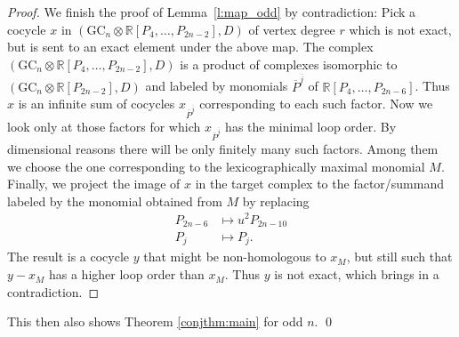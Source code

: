 \documentclass[a4paper]{amsart}
\theoremstyle{plain}
\theoremstyle{definition}
\newcommand{\R}{{\mathbb{R}}}
\newcommand{\GC}{\mathrm{GC}}
\begin{document}
\begin{proof}
We finish the proof of Lemma~\ref{l:map_odd} by contradiction: Pick a cocycle $x$ in $(\GC_n \otimes \R[P_4,\dots,P_{2n-2}], D)$ of vertex degree $r$ which is not exact, but is sent to an exact element under the above map. The complex $(\GC_n \otimes \R[P_4,\dots,P_{2n-2}], D)$ is a product of complexes
isomorphic to $(\GC_n\otimes \R[P_{2n-2}],D)$ and labeled by monomials ${\overline P}^{\overline j}$ of $\R[P_4,\dots,P_{2n-6}]$. 
Thus $x$ is an infinite sum  of cocycles $x_{{\overline P}^{\overline j}}$ corresponding to each such factor. Now we look only at those factors for which $x_{{\overline P}^{\overline j}}$  has the minimal loop order. 
By dimensional reasons there will be only finitely many such factors. Among them we choose the one corresponding to the lexicographically maximal monomial $M$. Finally, we project the image of $x$ in the target
complex to the factor/summand labeled by the monomial obtained from $M$ by replacing
\begin{align*}  
P_{2n-6}&\mapsto u^2 P_{2n-10} \\
P_j&\mapsto  P_j . 
\end{align*}
The result is a cocycle $y$ that might be non-homologous to $x_M$, but still such that $y-x_M$ has a higher loop order than $x_M$. Thus $y$ is not exact, which brings in a contradiction.
% 
\end{proof}

This then also shows Theorem \ref{conjthm:main} for odd $n$.
\hfill\qed
\end{document}
